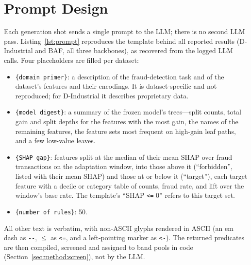 \documentclass[11pt]{article}
\begin{document}
\section{Prompt Design}
\label{sec:app_prompt}

Each generation shot sends a single prompt to the LLM; there is no second LLM pass.
Listing~\ref{lst:prompt} reproduces the template behind all reported results (D-Industrial and BAF,
all three backbones), as recovered from the logged LLM calls. Four placeholders are filled per
dataset:
\begin{itemize}[nosep,leftmargin=1.1em,topsep=2pt]
  \item \texttt{\{domain primer\}}: a description of the fraud-detection task and of the dataset's
    features and their encodings. It is dataset-specific and not reproduced; for D-Industrial it
    describes proprietary data.
  \item \texttt{\{model digest\}}: a summary of the frozen model's trees---split counts, total gain and
    split depths for the features with the most gain, the names of the remaining features, the
    feature sets most frequent on high-gain leaf paths, and a few low-value leaves.
  \item \texttt{\{SHAP gap\}}: features split at the median of their mean SHAP over fraud transactions
    on the adaptation window, into those above it (``forbidden'', listed with their mean SHAP) and
    those at or below it (``target''), each target feature with a decile or category table of counts,
    fraud rate, and lift over the window's base rate. The template's ``SHAP \texttt{<=} 0'' refers to
    this target set.
  \item \texttt{\{number of rules\}}: 50.
\end{itemize}
All other text is verbatim, with non-ASCII glyphs rendered in ASCII (an em dash as \texttt{-{}-},
$\leq$ as \texttt{<=}, and a left-pointing marker as \texttt{<-}). The returned predicates are then
compiled, screened and assigned to band pools in code (Section~\ref{sec:method:screen}), not by the
LLM.
\end{document}
